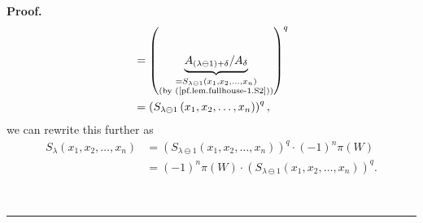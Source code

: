 \documentclass[numbers=enddot,12pt,final,onecolumn,notitlepage]{scrartcl}%
\numberwithin{exer}{section}
\theoremstyle{definition}
\newenvironment{proof}[1][Proof]{\noindent\textbf{#1.} }{\ \rule{0.5em}{0.5em}}
\theoremstyle{plainsl}
\begin{document}
\begin{proof}
\begin{align*}
&  =\left(  \underbrace{A_{\left(  \lambda\ominus1\right)  +\delta}/A_{\delta
}}_{\substack{=S_{\lambda\ominus1}\left(  x_{1},x_{2},\ldots,x_{n}\right)
\\\text{(by (\ref{pf.lem.fullhouse-1.S2}))}}}\right)  ^{q}\\
&  =\left(  S_{\lambda\ominus1}\left(  x_{1},x_{2},\ldots,x_{n}\right)
\right)  ^{q},
\end{align*}
we can rewrite this further as%
\begin{align}
S_{\lambda}\left(  x_{1},x_{2},\ldots,x_{n}\right)   &  =\left(
S_{\lambda\ominus1}\left(  x_{1},x_{2},\ldots,x_{n}\right)  \right)  ^{q}%
\cdot\left(  -1\right)  ^{n}\pi\left(  W\right) \nonumber\\
&  =\left(  -1\right)  ^{n}\pi\left(  W\right)  \cdot\left(  S_{\lambda
\ominus1}\left(  x_{1},x_{2},\ldots,x_{n}\right)  \right)  ^{q}.
\label{pf.lem.fullhouse-1.Sgen}%
\end{align}



\end{proof}
\end{document}
